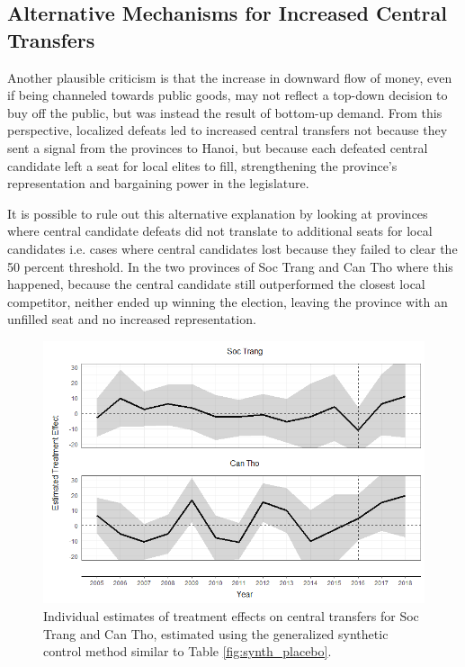 \documentclass[12pt]{article}
\newcommand{\1}{\mathbbm{1}}
\begin{document}
\subsection{Alternative Mechanisms for Increased Central Transfers}

Another plausible criticism is that the increase in downward flow of money, even if being channeled towards public goods, may not reflect a top-down decision to buy off the public, but was instead the result of bottom-up demand. From this perspective, localized defeats led to increased central transfers not because they sent a signal from the provinces to Hanoi, but because each defeated central candidate left a seat for local elites to fill, strengthening the province's representation and bargaining power in the legislature.

It is possible to rule out this alternative explanation by looking at provinces where central candidate defeats did not translate to additional seats for local candidates i.e. cases where central candidates lost because they failed to clear the 50 percent threshold. In the two provinces of Soc Trang and Can Tho where this happened, because the central candidate still outperformed the closest local competitor, neither ended up winning the election, leaving the province with an unfilled seat and no increased representation. 

\begin{figure}[!htbp]
	\centering
	\includegraphics[width=\textwidth]{figure/190618_synth_results_2prov.png}
	\captionsetup{singlelinecheck=off}
	\caption[Individual synthetic control treatment effects]{Individual estimates of treatment effects on central transfers for Soc Trang and Can Tho, estimated using the generalized synthetic control method similar to Table \ref{fig:synth_placebo}.}
	\label{fig:synth_mech}
\end{figure}
\end{document}
